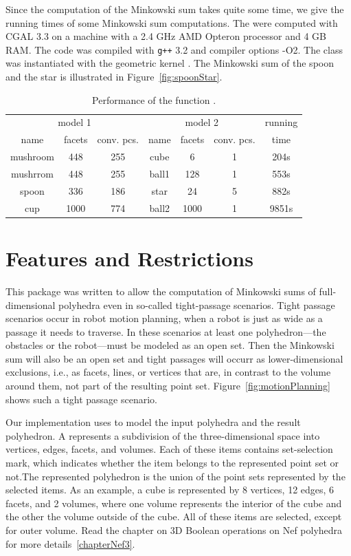 Since the computation of the Minkowski sum takes quite some time, we
give the running times of some Minkowski sum computations. The were
computed with CGAL 3.3 on a machine with a 2.4 GHz AMD Opteron
processor and 4 GB RAM. The code was compiled with
{\tt g++} 3.2 and compiler options -O2. The
 class was instantiated with the geometric
kernel . The Minkowski sum of the spoon
and the star is illustrated in Figure~\ref{fig:spoonStar}.

\begin{table}[h]
\center
\begin{tabular}{|ccc|ccc|c|}
\hline
\multicolumn{3}{|c|}{model 1} & \multicolumn{3}{|c|}{model 2} & running \\
name & facets & conv. pcs. & name & facets & conv. pcs. & time \\ 
\hline
mushroom & 448 & 255 & cube & 6 & 1 & 204s \\
mushrrom & 448 & 255 & ball1 & 128 & 1 & 553s \\
spoon & 336 & 186 & star & 24 & 5 & 882s \\
cup & 1000 & 774 & ball2 & 1000 & 1 & 9851s \\
\hline
\end{tabular}
\caption{Performance of the function .}
\end{table}

\section{Features and Restrictions}
\label{sec:restrictions}

This package was written to allow the computation of Minkowski sums of
full-dimensional polyhedra even in so-called tight-passage scenarios.
Tight passage scenarios occur in robot motion planning, when a robot
is just as wide as a passage it needs to traverse. In these scenarios
at least one polyhedron---the obstacles or the robot---must be modeled
as an open set. Then the Minkowski sum will also be an open set and
tight passages will occurr as lower-dimensional exclusions, i.e., as
facets, lines, or vertices that are, in contrast to the volume around
them, not part of the resulting point
set. Figure~\ref{fig:motionPlanning} shows such a tight passage
scenario.

Our implementation uses  to model the input
polyhedra and the result polyhedron. A 
represents a subdivision of the three-dimensional space into vertices,
edges, facets, and volumes. Each of these items contains set-selection
mark, which indicates whether the item belongs to the represented
point set or not.The represented polyhedron is the union of the point
sets represented by the selected items. As an example, a cube is
represented by 8 vertices, 12 edges, 6 facets, and 2 volumes, where
one volume represents the interior of the cube and the other the
volume outside of the cube. All of these items are selected, except
for outer volume.  Read the chapter on 3D Boolean operations on Nef
polyhedra for more details~\ref{chapterNef3}.

